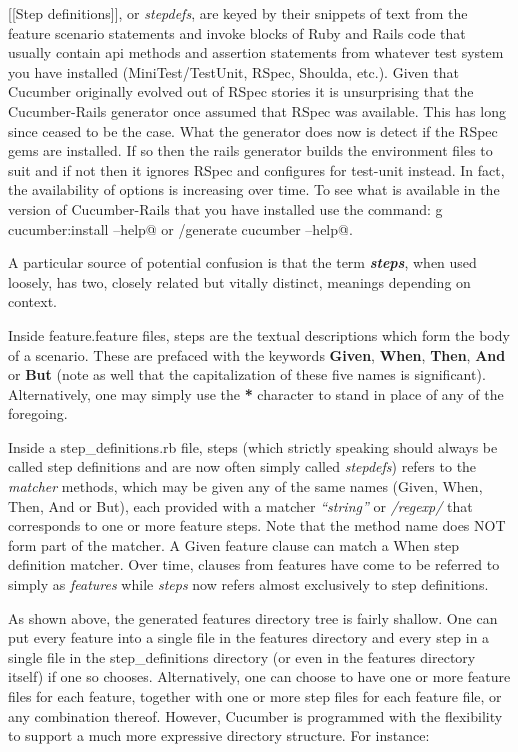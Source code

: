 \documentclass[10pt]{book}
\begin{document}
[[Step definitions]], or \emph{stepdefs}, are keyed by their snippets of text from the feature scenario statements and invoke blocks of Ruby and Rails code that usually contain api methods and assertion statements from whatever test system you have installed (MiniTest/TestUnit, RSpec, Shoulda, etc.).  Given that Cucumber originally evolved out of RSpec stories it is unsurprising that the Cucumber-Rails generator once assumed that RSpec was available.  This has long since ceased to be the case.  What the generator does now is detect if the RSpec gems are installed.  If so then the rails generator builds the environment files to suit and if not then it ignores RSpec and configures for test-unit instead.  In fact, the availability of options is increasing over time.  To see what is available in the version of Cucumber-Rails that you have installed use the command: \verb@rails g cucumber:install --help@ or \verb@script/generate cucumber --help@.

A particular source of potential confusion is that the term \emph{\textbf{steps}}, when used loosely, has two, closely related but vitally distinct, meanings depending on context.

Inside feature.feature files, steps are the textual descriptions which form the body of a scenario.  These are prefaced with the keywords \textbf{Given}, \textbf{When}, \textbf{Then}, \textbf{And} or \textbf{But} (note as well that the capitalization of these five names is significant).  Alternatively, one may simply use the \textbf{*} character to stand in place of any of the foregoing.

Inside a step\_definitions.rb file, steps (which strictly speaking should always be called step definitions and are now often simply called \emph{stepdefs}) refers to the \emph{matcher} methods, which may be given any of the same names (Given, When, Then, And or But), each provided with a matcher \emph{``string''} or \emph{/regexp/} that corresponds to one or more feature steps.  Note that the method name does NOT form part of the matcher.  A Given feature clause can match a When step definition matcher.  Over time, clauses from features have come to be referred to simply as \emph{features} while \emph{steps} now refers almost exclusively to step definitions.

As shown above, the generated features directory tree is fairly shallow.  One can put every feature into a single file in the features directory and every step in a single file in the step\_definitions directory (or even in the features directory itself) if one so chooses.  Alternatively, one can choose to have one or more feature files for each feature, together with one or more step files for each feature file, or any combination thereof.  However, Cucumber is programmed with the flexibility to support a much more expressive directory structure.  For instance:
\end{document}
